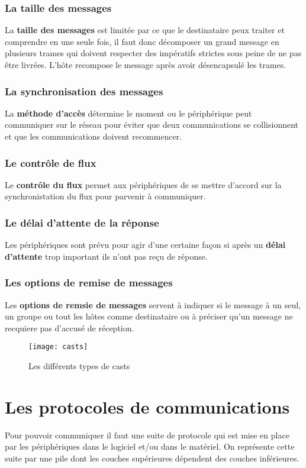  \subsubsection{La taille des messages}
 La \textbf{taille des messages} est limitée par ce que le destinataire peux traiter et comprendre en une seule fois, il faut donc décomposer un grand message en plusieurs trames qui doivent respecter des impératifs strictes sous peine de ne pas être livrées. L'hôte recompose le message après avoir désencapsulé les trames.

 \subsubsection{La synchronisation des messages}
 La \textbf{méthode d'accès} détermine le moment ou le périphérique peut communiquer sur le réseau pour éviter que deux communications se collisionnent et que les communications doivent recommencer.

 \subsubsection{Le contrôle de flux}
 Le \textbf{contrôle du flux} permet aux périphériques de se mettre d'accord sur la synchronistation du flux pour parvenir à communiquer.

 \subsubsection{Le délai d'attente de la réponse}
 Les périphériques sont prévu pour agir d'une certaine façon si après un \textbf{délai d'attente} trop important ils n'ont pas reçu de réponse.

 \subsubsection{Les options de remise de messages}
 Les \textbf{options de remsie de messages} servent à indiquer si le message à un seul, un groupe ou tout les hôtes comme destinataire ou à préciser qu'un message ne recquiere pas d'accusé de réception.

 \begin{figure}[h]
	 \centering
	 \texttt{[image: casts]}
	 \caption{Les différents types de casts}
 \end{figure}

 \section{Les protocoles de communications}
 Pour pouvoir communiquer il faut une suite de protocole qui est mise en place par les périphériques dans le logiciel et/ou dans le matériel. On représente cette suite par une pile dont les couches supérieures dépendent des couches inférieures.\\

